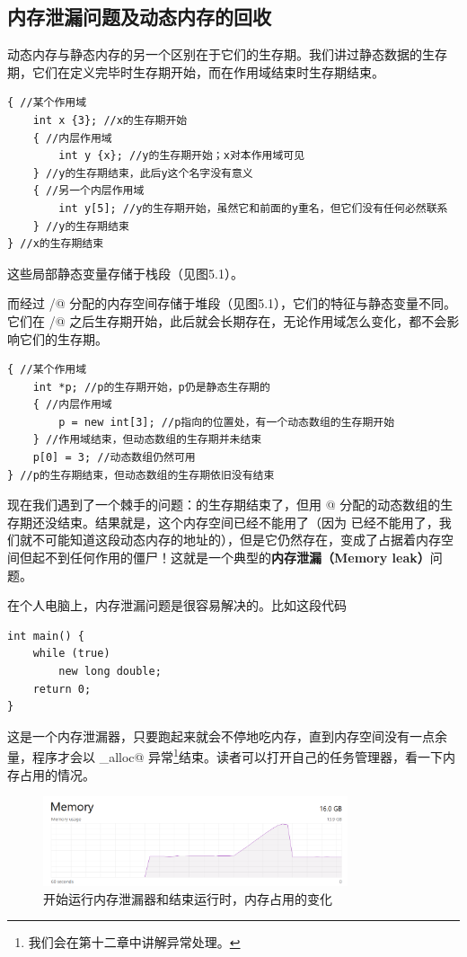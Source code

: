 \subsection*{内存泄漏问题及动态内存的回收}
动态内存与静态内存的另一个区别在于它们的生存期。我们讲过静态数据的生存期，它们在定义完毕时生存期开始，而在作用域结束时生存期结束。
\begin{lstlisting}
{ //某个作用域
    int x {3}; //x的生存期开始
    { //内层作用域
        int y {x}; //y的生存期开始；x对本作用域可见
    } //y的生存期结束，此后y这个名字没有意义
    { //另一个内层作用域
        int y[5]; //y的生存期开始，虽然它和前面的y重名，但它们没有任何必然联系
    } //y的生存期结束
} //x的生存期结束
\end{lstlisting}
这些局部静态变量存储于栈段（见图5.1）。\par\pagebreak
而经过 \lstinline@new@/\lstinline@new[]@ 分配的内存空间存储于堆段（见图5.1），它们的特征与静态变量不同。它们在 \lstinline@new@/\lstinline@new[]@ 之后生存期开始，此后就会长期存在，无论作用域怎么变化，都不会影响它们的生存期。
\begin{lstlisting}
{ //某个作用域
    int *p; //p的生存期开始，p仍是静态生存期的
    { //内层作用域
        p = new int[3]; //p指向的位置处，有一个动态数组的生存期开始
    } //作用域结束，但动态数组的生存期并未结束
    p[0] = 3; //动态数组仍然可用
} //p的生存期结束，但动态数组的生存期依旧没有结束
\end{lstlisting}
现在我们遇到了一个棘手的问题：\lstinline@p@ 的生存期结束了，但用 \lstinline@new[]@ 分配的动态数组的生存期还没结束。结果就是，这个内存空间已经不能用了（因为 \lstinline@p@ 已经不能用了，我们就不可能知道这段动态内存的地址的），但是它仍然存在，变成了占据着内存空间但起不到任何作用的僵尸！这就是一个典型的\textbf{内存泄漏（Memory leak）}问题。\par
在个人电脑上，内存泄漏问题是很容易解决的。比如这段代码
\begin{lstlisting}
int main() {
    while (true)
        new long double;
    return 0;
}
\end{lstlisting}
这是一个内存泄漏器，只要跑起来就会不停地吃内存，直到内存空间没有一点余量，程序才会以 \lstinline@bad_alloc@ 异常\footnote{我们会在第十二章中讲解异常处理。}结束。读者可以打开自己的任务管理器，看一下内存占用的情况。\par
\begin{figure}[htbp]
    \centering
    \includegraphics[width=0.8\textwidth]{../images/generalized_parts/05_memory_leak_and_after_end_task.png}
    \caption{开始运行内存泄漏器和结束运行时，内存占用的变化}
\end{figure}
